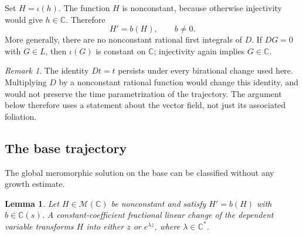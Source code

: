 \documentclass[11pt,reqno]{amsart}
\numberwithin{equation}{section}
\newtheorem{lemma}[theorem]{Lemma}
\theoremstyle{definition}
\theoremstyle{remark}
\newtheorem{remark}[theorem]{Remark}
\newcommand{\C}{\mathbb C}
\newcommand{\MM}{\mathcal M}
\begin{document}
Set $H=\iota(h)$. The function $H$ is nonconstant, because otherwise
injectivity would give $h\in\C$. Therefore
\begin{equation}
 H'=b(H),\qquad b\ne0.
 \label{eq:base-autonomous}
\end{equation}
More generally, there are no nonconstant rational first integrals of
$D$. If $DG=0$ with $G\in L$, then $\iota(G)$ is constant on $\C$;
injectivity again implies $G\in\C$.

\begin{remark}
\label{rem:time}
The identity $Dt=t$ persists under every birational change used here.
Multiplying $D$ by a nonconstant rational function would change this
identity, and would not preserve the time parametrization of the
trajectory. The argument below therefore uses a statement about the
vector field, not just its associated foliation.
\end{remark}

\subsection{The base trajectory}

The global meromorphic solution on the base can be classified without
any growth estimate.

\begin{lemma}
\label{lem:autonomous}
Let $H\in\MM(\C)$ be nonconstant and satisfy $H'=b(H)$ with
$b\in\C(s)$. A constant-coefficient fractional linear change of the
dependent variable transforms $H$ into either $z$ or $e^{\lambda z}$,
where $\lambda\in\C^*$.
\end{lemma}
\end{document}
